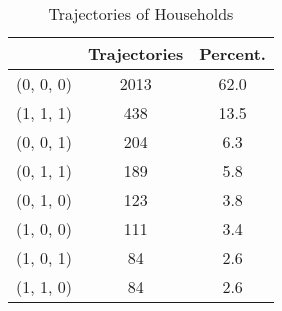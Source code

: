 \begin{table}
\centering
\caption{Trajectories of Households}
\label{tbl:Trajectories}
\begin{tabular}{lcc}
\toprule
{} &  Trajectories & Percent. \\
\midrule
(0, 0, 0) &          2013 & 62.0    \\
(1, 1, 1) &           438 & 13.5    \\
(0, 0, 1) &           204 & 6.3 \\
(0, 1, 1) &           189 & 5.8 \\
(0, 1, 0) &           123 & 3.8 \\
(1, 0, 0) &           111 & 3.4 \\
(1, 0, 1) &            84 & 2.6 \\
(1, 1, 0) &            84 & 2.6 \\
\bottomrule
\end{tabular}
\end{table}
